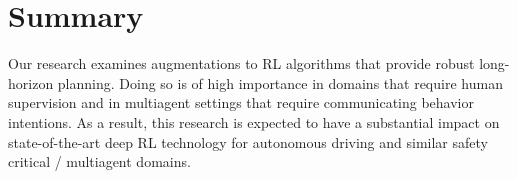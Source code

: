 \documentclass{article}
\begin{document}












    \section{Summary}
        Our research examines augmentations to RL algorithms that provide robust long-horizon planning. Doing so is of high importance in domains that require human supervision and in multiagent settings that require communicating behavior intentions. As a result, this research is expected to have a substantial impact on state-of-the-art deep RL technology for autonomous driving and similar safety critical / multiagent domains.
\end{document}
